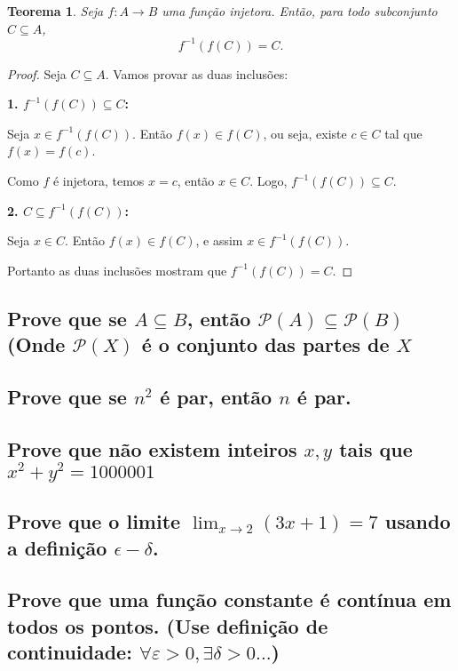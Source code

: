 \documentclass{article}
\newtheorem{theorem}{Teorema}[section]
\begin{document}
\begin{theorem}
Seja \( f: A \to B \) uma função injetora. Então, para todo subconjunto \( C \subseteq A \),
\[
    f^{-1}(f(C)) = C.
\]
\end{theorem}

\begin{proof}
Seja \( C \subseteq A \). Vamos provar as duas inclusões:

\textbf{1. \( f^{-1}(f(C)) \subseteq C \):}

Seja \( x \in f^{-1}(f(C)) \). Então \( f(x) \in f(C) \), ou seja, existe \( c \in C \) tal que \( f(x) = f(c) \).

Como \( f \) é injetora, temos \( x = c \), então \( x \in C \). Logo, \( f^{-1}(f(C)) \subseteq C \).

\textbf{2. \( C \subseteq f^{-1}(f(C)) \):}

Seja \( x \in C \). Então \( f(x) \in f(C) \), e assim \( x \in f^{-1}(f(C)) \).

Portanto as duas inclusões mostram que \( f^{-1}(f(C)) = C \).
\end{proof}

\subsection{Prove que se $A \subseteq B$, então $\mathcal{P}(A) \subseteq \mathcal{P}(B)$ (Onde $\mathcal{P}(X)$ é o conjunto das partes de $X$}

\subsection{Prove que se $n^2$ é par, então $n$ é par.}

\subsection{Prove que não existem inteiros $x,y$ tais que $x^2 + y^2 = 1000001$}

\subsection{Prove que o limite $\lim_{x \to 2} (3x + 1) = 7$ usando a definição $\epsilon-\delta$.}

\subsection{Prove que uma função constante é contínua em todos os pontos. (Use definição de continuidade: $\forall \varepsilon \gt 0, \exists \delta \gt 0...$)}
\end{document}

